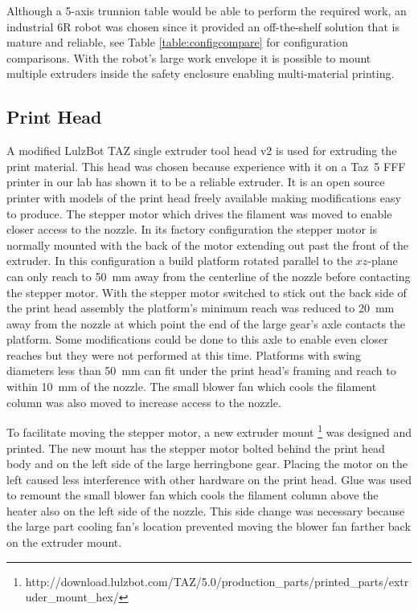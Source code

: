 \documentclass[main.tex]{subfiles}
\begin{document}
Although a 5\nobreakdash-axis trunnion table would be able to perform the required work, an industrial 6R robot was chosen since it provided an off-the-shelf solution that is mature and reliable, see Table \ref{table:configcompare} for configuration comparisons. 
With the robot's large work envelope it is possible to mount multiple extruders inside the safety enclosure enabling multi-material printing.

\subsection{Print Head}
A modified LulzBot TAZ single extruder tool head v2 is used for extruding the print material.
This head was chosen because experience with it on a Taz~5 FFF printer in our lab has shown it to be a reliable extruder.
It is an open source printer with models of the print head freely available making modifications easy to produce.
The stepper motor which drives the filament was moved to enable closer access to the nozzle.
In its factory configuration the stepper motor is normally mounted with the back of the motor extending out past the front of the extruder.
In this configuration a build platform rotated parallel to the $xz$\nobreakdash-plane can only reach to \SI{50}{mm} away from the centerline of the nozzle before contacting the stepper motor.
With the stepper motor switched to stick out the back side of the print head assembly the platform's minimum reach was reduced to \SI{20}{mm} away from the nozzle at which point the end of the large gear's axle contacts the platform.
Some modifications could be done to this axle to enable even closer reaches but they were not performed at this time.
Platforms with swing diameters less than \SI{50}{mm} can fit under the print head's framing and reach to within \SI{10}{mm} of the nozzle.
The small blower fan which cools the filament column was also moved to increase access to the nozzle.

To facilitate moving the stepper motor, a new extruder mount%
\footnote{http://download.lulzbot.com/TAZ/5.0/production\_parts/printed\_parts/extruder\_mount\_hex/}
was designed and printed.
The new mount has the stepper motor bolted behind the print head body and on the left side of the large herringbone gear.
Placing the motor on the left caused less interference with other hardware on the print head.
Glue was used to remount the small blower fan which cools the filament column above the heater also on the left side of the nozzle.
This side change was necessary because the large part cooling fan's location prevented moving the blower fan farther back on the extruder mount.
\end{document}
